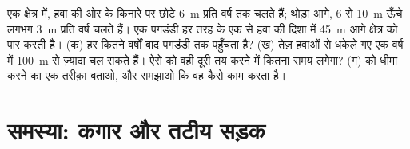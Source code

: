 \begin{exercise}[$\star\star\star$]\label{exo:g9:landforms:12}
एक  क्षेत्र में, हवा की ओर के किनारे पर छोटे  \qty{6}{m} प्रति वर्ष तक चलते हैं;
थोड़ा आगे, 6 से \qty{10}{m} ऊँचे  लगभग \qty{3}{m} प्रति वर्ष चलते हैं। एक
पगडंडी हर तरह के एक  से हवा की दिशा में \qty{45}{m} आगे क्षेत्र को पार करती है।
(क) हर  कितने वर्षों बाद पगडंडी तक पहुँचता है? (ख) तेज़ हवाओं से धकेले गए  एक
वर्ष में \qty{100}{m} से ज़्यादा चल सकते हैं। ऐसे  को वही दूरी तय करने में कितना
समय लगेगा? (ग)  को धीमा करने का एक तरीक़ा बताओ, और समझाओ कि वह कैसे काम करता
है।
\end{exercise}

\section{समस्या: कगार और तटीय सड़क}

